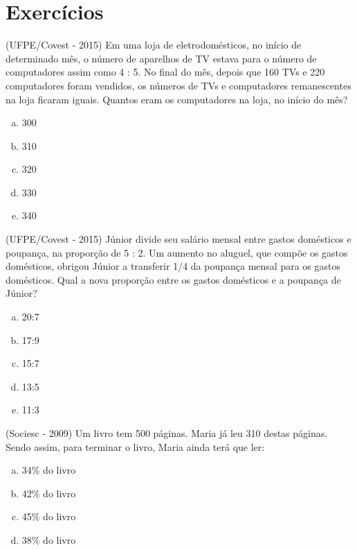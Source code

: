  \section{Exercícios}

\begin{exer}
(UFPE/Covest - 2015) Em uma loja de eletrodomésticos, no início de determinado mês, o número de aparelhos de TV estava para o número de computadores assim como 4 : 5. No final do mês, depois que 160 TVs e 220 computadores foram vendidos, os números de TVs e computadores remanescentes na loja ficaram iguais. Quantos eram os computadores na loja, no início do mês?
  \begin{enumerate}[a)]
  \item 300
  \item 310
  \item 320
  \item 330
  \item 340
  \end{enumerate}
 \end{exer}
 
 \begin{exer}
 (UFPE/Covest - 2015) Júnior divide seu salário mensal entre gastos domésticos e poupança, na proporção de 5 : 2. Um aumento no aluguel, que compõe os gastos domésticos, obrigou Júnior a transferir 1/4 da poupança mensal para os gastos domésticos. Qual a nova proporção entre os gastos domésticos e a poupança de Júnior?
  \begin{enumerate}[a)]
  \item 20:7
  \item 17:9
  \item 15:7
  \item 13:5
  \item 11:3
  \end{enumerate}
 \end{exer}
 
 \begin{exer}
 (Sociesc - 2009) Um livro tem 500 páginas. Maria já leu 310 destas páginas. Sendo assim, para terminar o livro, Maria ainda terá que ler:
  \begin{enumerate}[a)]
  \item 34\% do livro
  \item 42\% do livro
  \item 45\% do livro
  \item 38\% do livro
 \end{enumerate}
 \end{exer}
 
